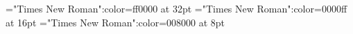 \documentclass[a4paper]{article}
\begin{document}
\pagestyle{plain}
\sloppy
\setlength{\parfillskip}{0pt plus 1fil}
\font\ta="Times New Roman":color=ff0000 at 32pt
\font\tbta="Times New Roman":color=0000ff at 16pt
\font\tctbta="Times New Roman":color=008000 at 8pt

\mbox{} 
\newpage 
\newpage 
\setcounter{page}{1} 
\pagestyle{fancy} 

\end{document}
